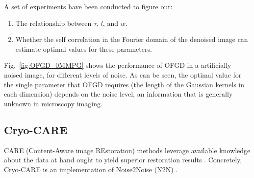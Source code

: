 \documentclass{article}
\begin{document}
A set of experiments have been conducted to figure out:
\begin{enumerate}
\item The relationship between $\tau$, $l$, and $w$.
\item Whether the self correlation in the Fourier domain of the
  denoised image can estimate optimal values for these parameters.
\end{enumerate}

Fig.~\ref{fig:OFGD_0MMPG} shows the performance of OFGD in a artificially
noised image, for different levels of noise. As can be seen, the
optimal value for the single parameter that OFGD requires (the length of
the Gaussian kernels in each dimension) depends on the noise level, an
information that is generally unknown in microscopy imaging.





\subsection{Cryo-CARE \cite{buchholz2019cryo}}
CARE (Content-Aware image REstoration) methods leverage
available knowledge about the data at hand ought to yield superior
restoration results \cite{weigert2018content}. Concretely, Cryo-CARE
is an implementation of Noise2Noise (N2N) \cite{lehtinen2018noise2noise}.
\end{document}
